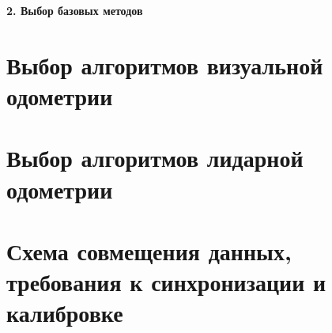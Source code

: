 \newpage
\begin{center}
  \textbf{\large 2. Выбор базовых методов}
\end{center}

\section{Выбор алгоритмов визуальной одометрии}
\section{Выбор алгоритмов лидарной одометрии}
\section{Схема совмещения данных, требования к синхронизации и калибровке}